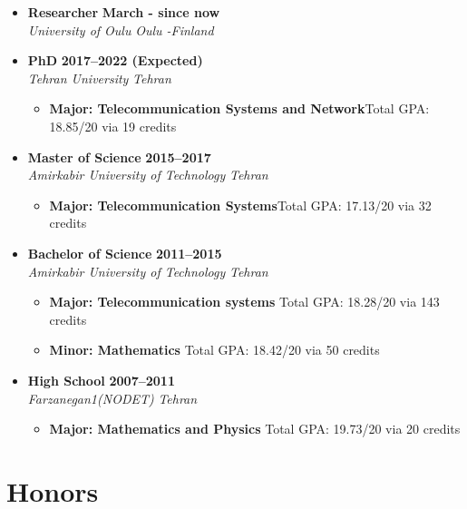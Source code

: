 \documentclass[10pt,a4paper,sans]{moderncv} %
\begin{document}
\begin{itemize}
\item \textbf{Researcher} \hfill \textbf{March - since now}
\\
\emph{University of Oulu} \hfill \emph{Oulu -Finland}
\item \textbf{PhD} \hfill \textbf{2017--2022 (Expected)} \\
\emph{Tehran University} \hfill \emph{Tehran}
\begin{itemize}
\item \textbf{Major: Telecommunication Systems and Network}\hfill Total GPA: 18.85/20 via 19 credits
\end{itemize}
\item \textbf{Master of Science} \hfill \textbf{2015--2017 } \\
\emph{Amirkabir University of Technology} \hfill \emph{Tehran}
\begin{itemize}
\item \textbf{Major: Telecommunication Systems}\hfill Total GPA: 17.13/20 via 32 credits
\end{itemize}

\item \textbf{Bachelor of Science} \hfill \textbf{2011--2015} \\
\emph{Amirkabir University of Technology} \hfill \emph{Tehran}

\begin{itemize}
\item \textbf{Major: Telecommunication systems} \hfill Total GPA: 18.28/20 via 143 credits
\item \textbf{Minor: Mathematics} \hfill  Total GPA: 18.42/20  via 50 credits 
\end{itemize}

\item \textbf{High School} \hfill \textbf{2007--2011} \\
\emph{Farzanegan1(NODET)} \hfill \emph{Tehran}
\begin{itemize}
\item \textbf{Major: Mathematics and Physics} \hfill Total GPA: 19.73/20 via 20 credits
\end{itemize}
\end{itemize}


\section{Honors}
\end{document}
